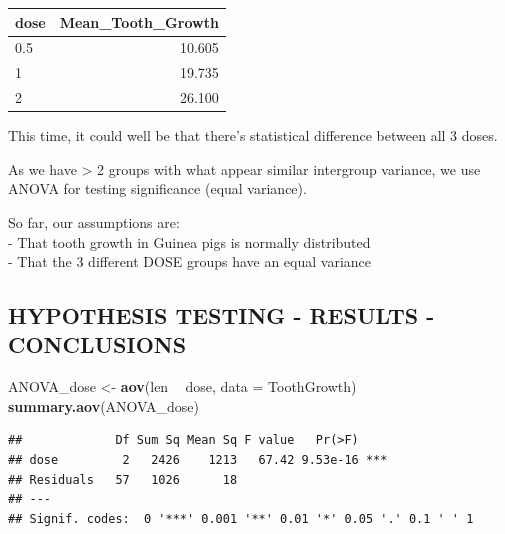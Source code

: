 \documentclass[]{article}
\newenvironment{Shaded}{\begin{snugshade}}{\end{snugshade}}
\newcommand{\DataTypeTok}[1]{\textcolor[rgb]{0.13,0.29,0.53}{#1}}
\newcommand{\KeywordTok}[1]{\textcolor[rgb]{0.13,0.29,0.53}{\textbf{#1}}}
\newcommand{\NormalTok}[1]{#1}
\newcommand{\OperatorTok}[1]{\textcolor[rgb]{0.81,0.36,0.00}{\textbf{#1}}}
\newcommand{\StringTok}[1]{\textcolor[rgb]{0.31,0.60,0.02}{#1}}
\begin{document}
\begin{Shaded}
\end{Shaded}

\begin{longtable}[]{@{}lr@{}}
\toprule
dose & Mean\_Tooth\_Growth\tabularnewline
\midrule
\endhead
0.5 & 10.605\tabularnewline
1 & 19.735\tabularnewline
2 & 26.100\tabularnewline
\bottomrule
\end{longtable}

This time, it could well be that there's statistical difference between
all 3 doses.

As we have \textgreater{} 2 groups with what appear similar intergroup
variance, we use ANOVA for testing significance (equal variance).

So far, our assumptions are:\\
- That tooth growth in Guinea pigs is normally distributed\\
- That the 3 different DOSE groups have an equal variance

\break

\hypertarget{hypothesis-testing---results---conclusions}{%
\subsection{HYPOTHESIS TESTING - RESULTS -
CONCLUSIONS}\label{hypothesis-testing---results---conclusions}}

\begin{Shaded}
\begin{Highlighting}[]
\NormalTok{ANOVA_dose <-}\StringTok{ }\KeywordTok{aov}\NormalTok{(len }\OperatorTok{~}\StringTok{ }\NormalTok{dose, }\DataTypeTok{data =}\NormalTok{ ToothGrowth)}
\KeywordTok{summary.aov}\NormalTok{(ANOVA_dose)}
\end{Highlighting}
\end{Shaded}

\begin{verbatim}
##             Df Sum Sq Mean Sq F value   Pr(>F)    
## dose         2   2426    1213   67.42 9.53e-16 ***
## Residuals   57   1026      18                     
## ---
## Signif. codes:  0 '***' 0.001 '**' 0.01 '*' 0.05 '.' 0.1 ' ' 1
\end{verbatim}
\end{document}
